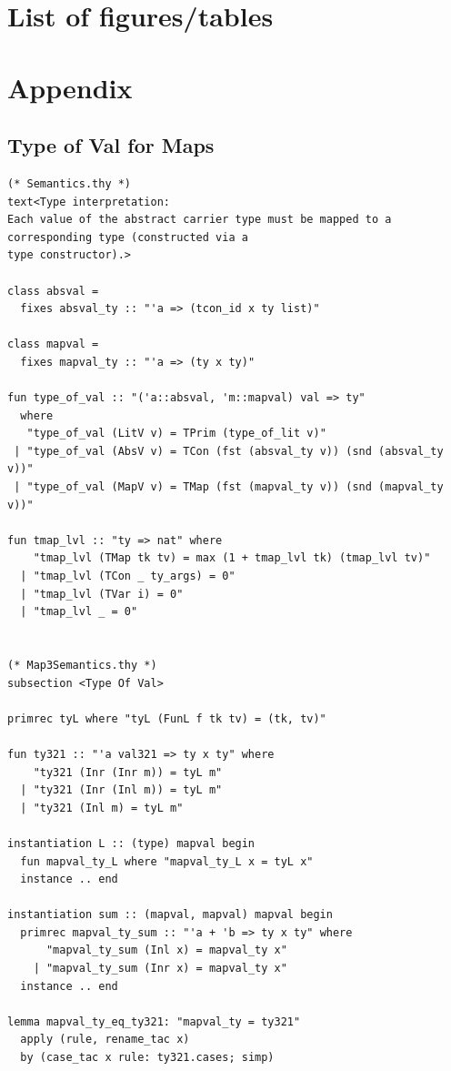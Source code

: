 \documentclass[11pt]{article}
\begin{document}
\section*{List of figures/tables}

\pagebreak

\appendix
\section{Appendix}
\label{sec:appendix}

\subsection{Type of Val for Maps}

\begin{verbatim}
(* Semantics.thy *)
text<Type interpretation:
Each value of the abstract carrier type must be mapped to a corresponding type (constructed via a
type constructor).>

class absval =
  fixes absval_ty :: "'a => (tcon_id x ty list)"

class mapval =
  fixes mapval_ty :: "'a => (ty x ty)"

fun type_of_val :: "('a::absval, 'm::mapval) val => ty"
  where
   "type_of_val (LitV v) = TPrim (type_of_lit v)"
 | "type_of_val (AbsV v) = TCon (fst (absval_ty v)) (snd (absval_ty v))"
 | "type_of_val (MapV v) = TMap (fst (mapval_ty v)) (snd (mapval_ty v))"

fun tmap_lvl :: "ty => nat" where
    "tmap_lvl (TMap tk tv) = max (1 + tmap_lvl tk) (tmap_lvl tv)"
  | "tmap_lvl (TCon _ ty_args) = 0"
  | "tmap_lvl (TVar i) = 0"
  | "tmap_lvl _ = 0"


(* Map3Semantics.thy *)
subsection <Type Of Val>

primrec tyL where "tyL (FunL f tk tv) = (tk, tv)"

fun ty321 :: "'a val321 => ty x ty" where
    "ty321 (Inr (Inr m)) = tyL m"
  | "ty321 (Inr (Inl m)) = tyL m"
  | "ty321 (Inl m) = tyL m"

instantiation L :: (type) mapval begin
  fun mapval_ty_L where "mapval_ty_L x = tyL x"
  instance .. end

instantiation sum :: (mapval, mapval) mapval begin
  primrec mapval_ty_sum :: "'a + 'b => ty x ty" where
      "mapval_ty_sum (Inl x) = mapval_ty x"
    | "mapval_ty_sum (Inr x) = mapval_ty x"
  instance .. end

lemma mapval_ty_eq_ty321: "mapval_ty = ty321"
  apply (rule, rename_tac x)
  by (case_tac x rule: ty321.cases; simp)


\end{verbatim}
\end{document}
